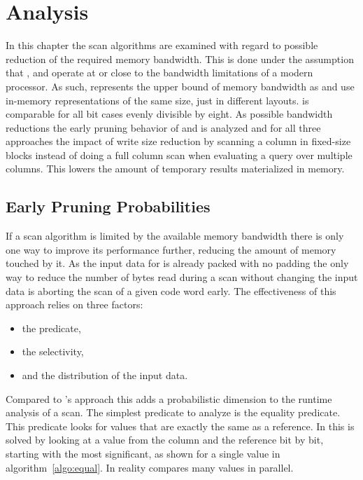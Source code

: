\chapter{Analysis}

In this chapter the scan algorithms are examined with regard to possible
reduction of the required memory bandwidth. This is done under the assumption
that \simdscan{}, \bwv{} and \bs{} operate at or close to the bandwidth
limitations of a modern processor. As such, \simdscan{} represents the upper
bound of memory bandwidth as \simdscan{} and \bwv{} use in-memory representations
of the same size, just in different layouts. \bs{} is comparable for all bit
cases evenly divisible by eight. As possible bandwidth reductions the early
pruning behavior of \bwv{} and \bs{} is analyzed and for all three approaches
the impact of write size reduction by scanning a column in fixed-size blocks
instead of doing a full column scan when evaluating a query over multiple
columns. This lowers the amount of temporary results materialized in memory.

\section{Early Pruning Probabilities}

If a scan algorithm is limited by the available memory bandwidth there is only
one way to improve its performance further, reducing the amount of memory
touched by it. As the input data for \bwv{} is already packed with no padding
the only way to reduce the number of bytes read during a scan without changing
the input data is aborting the scan of a given code word early. The
effectiveness of this approach relies on three factors:

\begin{itemize}
  \item the predicate,
  \item the selectivity,
  \item and the distribution of the input data.
\end{itemize}

Compared to \simdscan{}'s approach this adds a probabilistic dimension to the
runtime analysis of a scan. The simplest predicate to analyze is the equality
predicate. This predicate looks for values that are exactly the same as a
reference. In \bwv{} this is solved by looking at a value from the column and
the reference bit by bit, starting with the most significant, as shown for a
single value in algorithm~\ref{algo:equal}. In reality \bwv{} compares many
values in parallel.

